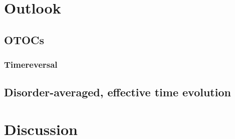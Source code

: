 \chapter{Outlook}
\section{OTOCs}
\subsection{Timereversal}
\section{Disorder-averaged, effective time evolution}

\chapter{Discussion}
